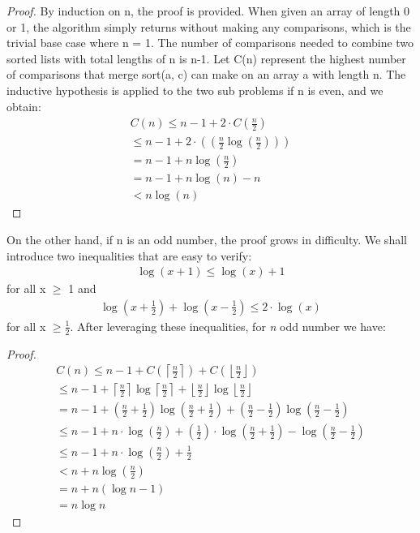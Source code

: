 \documentclass[11pt, letter paper]{article}
\begin{document}
    \renewcommand\qedsymbol{QED}
    \begin{proof}
    By induction on n, the proof is provided. When given an array of length 0 or 1, the algorithm simply returns without making any comparisons, which is the trivial base case where n = 1. The number of comparisons needed to combine two sorted lists with total lengths of n is n-1. Let C(n) represent the highest number of comparisons that merge sort(a, c) can make on an array a with length n. The inductive hypothesis is applied to the two sub problems if n is even, and we obtain:\cite{Morin}
        \begin{gather*}
             C(n) \leq n - 1 + 2 \cdot C(\frac{n}{2}) \\
                  \leq n - 1 + 2 \cdot ((\frac{n}{2}\log(\frac{n}{2}))) \\
                  = n - 1 + n \log(\frac{n}{2}) \\
                  = n - 1 + n \log(n) - n \\
                  < n\log(n)
        \end{gather*}
    \end{proof}

    On the other hand, if n is an odd number, the proof grows in difficulty. We shall introduce two inequalities that are easy to verify:
        \begin{gather*}
            \log(x + 1) \leq \log(x)  + 1
        \end{gather*}
    for all x $\geq$ 1 and 
        \begin{gather*}
            \log(x + \frac{1}{2}) + \log(x - \frac{1}{2}) \leq 2 \cdot \log(x)
        \end{gather*}
    for all x $\geq \frac{1}{2}$. After leveraging these inequalities, for \textit{n} odd number we have: \cite{Morin}
     \begin{proof}  
        \begin{gather*}
            C(n) \leq n - 1 + C(\left \lceil \frac{n}{2} \right \rceil) + C(\left \lfloor \frac{n}{2} \right \rfloor) \\
                \leq n - 1 + \left \lceil \frac{n}{2} \right \rceil \log \left \lceil \frac{n}{2} \right \rceil + \left \lfloor \frac{n}{2} \right \rfloor \log \left \lfloor \frac{n}{2} \right \rfloor \\
                = n - 1 + (\frac{n}{2} + \frac{1}{2})\log(\frac{n}{2} + \frac{1}{2}) + (\frac{n}{2} - \frac{1}{2})\log(\frac{n}{2} - \frac{1}{2}) \\
                \leq n - 1 + n \cdot \log(\frac{n}{2}) + (\frac{1}{2}) \cdot \log(\frac{n}{2} + \frac{1}{2}) - \log(\frac{n}{2} - \frac{1}{2}) \\
                \leq n - 1 + n \cdot \log(\frac{n}{2}) + \frac{1}{2} \\
                < n + n\log(\frac{n}{2}) \\ 
                = n + n(\log n - 1) \\
                = n \log n
        \end{gather*}
    \end{proof}
\end{document}
